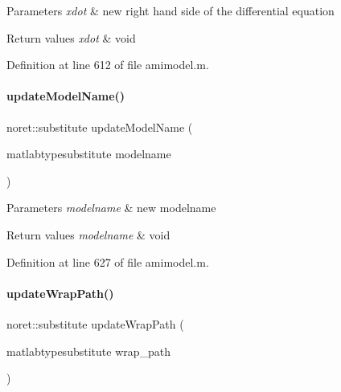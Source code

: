 \begin{DoxyParams}{Parameters}
{\em xdot} & new right hand side of the differential equation\\
\hline
\end{DoxyParams}

\begin{DoxyRetVals}{Return values}
{\em xdot} & void \\
\hline
\end{DoxyRetVals}


Definition at line 612 of file amimodel.\+m.

\mbox{\label{classamimodel_a5692662c7851369abd5ca0e51295f33a}} 
\paragraph{\texorpdfstring{updateModelName()}{updateModelName()}}
{\footnotesize\ttfamily noret\+::substitute update\+Model\+Name (\begin{DoxyParamCaption}\item[{matlabtypesubstitute}]{modelname }\end{DoxyParamCaption})}


\begin{DoxyParams}{Parameters}
{\em modelname} & new modelname\\
\hline
\end{DoxyParams}

\begin{DoxyRetVals}{Return values}
{\em modelname} & void \\
\hline
\end{DoxyRetVals}


Definition at line 627 of file amimodel.\+m.

\mbox{\label{classamimodel_a802e66e0a311bd894de30058b7bf028a}} 
\paragraph{\texorpdfstring{updateWrapPath()}{updateWrapPath()}}
{\footnotesize\ttfamily noret\+::substitute update\+Wrap\+Path (\begin{DoxyParamCaption}\item[{matlabtypesubstitute}]{wrap\+\_\+path }\end{DoxyParamCaption})}


